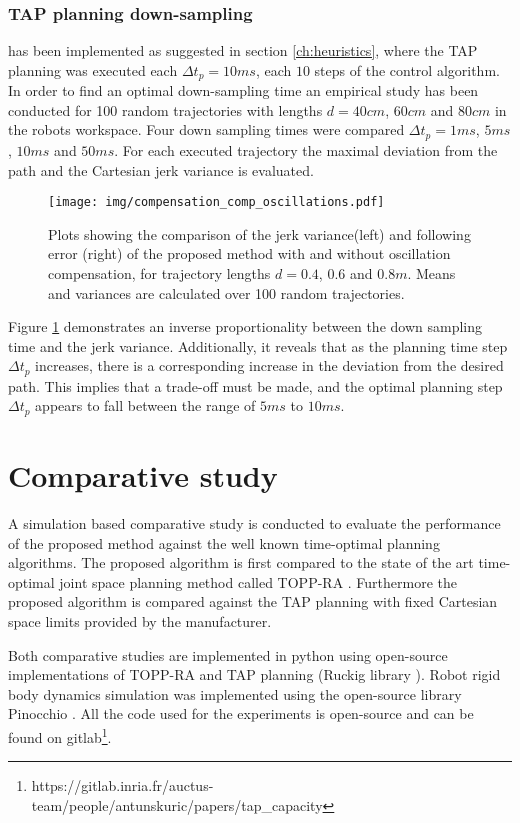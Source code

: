 
\subsubsection{TAP planning down-sampling} has been implemented as suggested in section \ref{ch:heuristics}, where the TAP planning was executed each $\Delta t_{p}\!=\!10ms$, each $10$ steps of the control algorithm. In order to find an optimal down-sampling time an empirical study has been conducted for 100 random trajectories with lengths $d=40cm$, $60cm$ and $80cm$ in the robots workspace. Four down sampling times were compared $\Delta t_p =1ms$, $5ms$, $10ms$ and $50ms$. For each executed trajectory the maximal deviation from the path and the Cartesian jerk variance is evaluated. 
\begin{figure}[!t]
    \centering
    \texttt{[image: img/compensation\_comp\_oscillations.pdf]}
    \caption{Plots showing the comparison of the jerk variance(left) and following error (right) of the proposed method with and without oscillation compensation, for trajectory lengths $d=0.4$, $0.6$ and $0.8m$. Means and variances are calculated over 100 random trajectories. }
    \label{fig:compensatiopn_comp_oscillations}
\end{figure}

Figure \ref{fig:compensatiopn_comp_oscillations} demonstrates an inverse proportionality between the down sampling time and the jerk variance. Additionally, it reveals that as the planning time step $\Delta t_p$ increases, there is a corresponding increase in the deviation from the desired path. This implies that a trade-off must be made, and the optimal planning step $\Delta t_p$ appears to fall between the range of $5ms$ to $10ms$.

\section{Comparative study}
\label{ch:comp_study}
A simulation based comparative study is conducted to evaluate the performance of the proposed method against the well known time-optimal planning algorithms. The proposed algorithm is first compared to the state of the art time-optimal joint space planning method called TOPP-RA \cite{Pham2018}. Furthermore the proposed algorithm is compared against the TAP planning with fixed Cartesian space limits provided by the manufacturer.

Both comparative studies are implemented in python
using open-source implementations of TOPP-RA \cite{Pham2018} and TAP planning (Ruckig library \cite{ruckig}). 
Robot rigid body dynamics simulation was implemented using the open-source library Pinocchio \cite{pinocchio2021}. 
All the code used for the experiments is open-source and can be found on gitlab\footnote{https://gitlab.inria.fr/auctus-team/people/antunskuric/papers/tap_capacity}.


